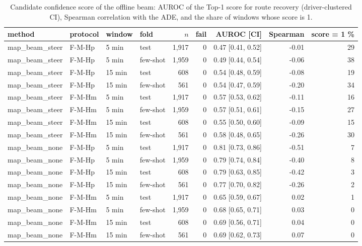 \begin{table}[t]\centering\scriptsize\setlength{\tabcolsep}{3pt}
\caption{Candidate confidence score of the offline beam: AUROC of the Top-1 score for route recovery (driver-clustered CI), Spearman correlation with the ADE, and the share of windows whose score is 1.}\label{tab:supp_conf}
\begin{tabular}{llllrrrrr}\toprule
method & protocol & window & fold & $n$ & fail & AUROC [CI] & Spearman & score = 1 \% \\\midrule
map\_beam\_steer & F-M-Hp & 5 min & test & 1{,}917 & 0 & 0.47 [0.41, 0.52] & -0.01 & 29 \\
map\_beam\_steer & F-M-Hp & 5 min & few-shot & 1{,}959 & 0 & 0.49 [0.44, 0.54] & -0.06 & 38 \\
map\_beam\_steer & F-M-Hp & 15 min & test & 608 & 0 & 0.54 [0.48, 0.59] & -0.08 & 19 \\
map\_beam\_steer & F-M-Hp & 15 min & few-shot & 561 & 0 & 0.54 [0.47, 0.59] & -0.20 & 34 \\
map\_beam\_steer & F-M-Hm & 5 min & test & 1{,}917 & 0 & 0.57 [0.53, 0.62] & -0.11 & 16 \\
map\_beam\_steer & F-M-Hm & 5 min & few-shot & 1{,}959 & 0 & 0.57 [0.51, 0.61] & -0.15 & 27 \\
map\_beam\_steer & F-M-Hm & 15 min & test & 608 & 0 & 0.55 [0.50, 0.60] & -0.09 & 15 \\
map\_beam\_steer & F-M-Hm & 15 min & few-shot & 561 & 0 & 0.58 [0.48, 0.65] & -0.26 & 30 \\
map\_beam\_none & F-M-Hp & 5 min & test & 1{,}917 & 0 & 0.81 [0.73, 0.86] & -0.51 & 7 \\
map\_beam\_none & F-M-Hp & 5 min & few-shot & 1{,}959 & 0 & 0.79 [0.74, 0.84] & -0.40 & 8 \\
map\_beam\_none & F-M-Hp & 15 min & test & 608 & 0 & 0.79 [0.63, 0.85] & -0.42 & 3 \\
map\_beam\_none & F-M-Hp & 15 min & few-shot & 561 & 0 & 0.77 [0.70, 0.82] & -0.26 & 2 \\
map\_beam\_none & F-M-Hm & 5 min & test & 1{,}917 & 0 & 0.65 [0.59, 0.67] & 0.02 & 1 \\
map\_beam\_none & F-M-Hm & 5 min & few-shot & 1{,}959 & 0 & 0.68 [0.65, 0.71] & 0.03 & 0 \\
map\_beam\_none & F-M-Hm & 15 min & test & 608 & 0 & 0.69 [0.56, 0.71] & 0.04 & 0 \\
map\_beam\_none & F-M-Hm & 15 min & few-shot & 561 & 0 & 0.69 [0.62, 0.73] & 0.07 & 0 \\
\bottomrule\end{tabular}
\end{table}
